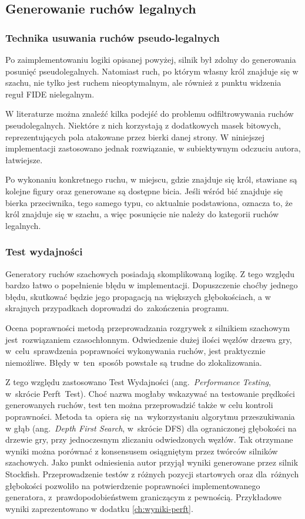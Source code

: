 \subsection{Generowanie ruchów legalnych}
\label{subsec:generowanie-ruchow-legalnych}

\subsubsection{Technika usuwania ruchów pseudo-legalnych}

Po zaimplementowaniu logiki opisanej powyżej, silnik był zdolny do generowania posunięć pseudolegalnych.
Natomiast ruch, po którym własny król znajduje się w szachu, nie tylko jest ruchem nieoptymalnym, ale również z punktu widzenia reguł FIDE nielegalnym.

W literaturze można znaleźć kilka podejść do problemu odfiltrowywania ruchów pseudolegalnych.
Niektóre z nich korzystają z dodatkowych masek bitowych, reprezentujących pola atakowane przez bierki danej strony.
W niniejszej implementacji zastosowano jednak rozwiązanie, w subiektywnym odczuciu autora, łatwiejsze.

Po wykonaniu konkretnego ruchu, w miejscu, gdzie znajduje się król, stawiane są kolejne figury oraz generowane są dostępne bicia.
Jeśli wśród bić znajduje się bierka przeciwnika, tego samego typu, co aktualnie podstawiona, oznacza to, że król znajduje się w szachu, a więc posunięcie nie należy do kategorii ruchów legalnych.

\subsubsection{Test wydajności}

Generatory ruchów szachowych posiadają skomplikowaną logikę.
Z tego względu bardzo łatwo o popełnienie błędu w implementacji.
Dopuszczenie choćby jednego błędu, skutkować będzie jego propagacją na większych głębokościach, a w skrajnych przypadkach doprowadzi do~zakończenia programu.

Ocena poprawności metodą przeprowadzania rozgrywek z silnikiem szachowym jest~rozwiązaniem czasochłonnym.
Odwiedzenie dużej ilości węzłów drzewa gry, w~celu~sprawdzenia poprawności wykonywania ruchów, jest praktycznie niemożliwe.
Błędy w~ten~sposób powstałe są trudne do zlokalizowania.

Z tego względu zastosowano Test Wydajności (ang.~\emph{Performance Testing}, w~skrócie Perft~Test).
Choć nazwa mogłaby wskazywać na testowanie prędkości generowanych ruchów, test ten można przeprowadzić także w celu kontroli poprawności.
Metoda ta~opiera się~na~wykorzystaniu algorytmu przeszukiwania w głąb (ang.~\emph{Depth First Search}, w~skrócie DFS) dla ograniczonej głębokości na drzewie gry, przy jednoczesnym zliczaniu odwiedzonych węzłów.
Tak otrzymane wyniki można porównać z konsensusem osiągniętym przez twórców silników szachowych.
Jako punkt odniesienia autor przyjął wyniki generowane przez silnik Stockfish.
Przeprowadzenie testów z różnych pozycji startowych oraz dla~różnych głębokości pozwoliło na potwierdzenie poprawności implementowanego generatora, z~prawdopodobieństwem graniczącym z pewnością.
Przykładowe wyniki zaprezentowano w dodatku \ref{ch:wyniki-perft}.

